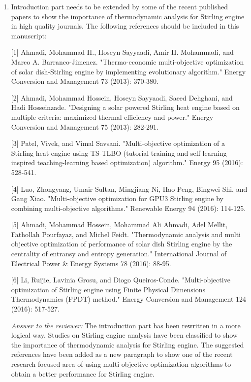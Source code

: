 \documentclass[12pt]{letter}
\begin{document}
\begin{enumerate}
\item Introduction part needs to be extended by some of the recent published papers to show the importance of thermodynamic analysis for Stirling engine in high quality journals. The following references should be included in this manuscript:

[1] Ahmadi, Mohammad H., Hoseyn Sayyaadi, Amir H. Mohammadi, and Marco A. Barranco-Jimenez. "Thermo-economic multi-objective optimization of solar dish-Stirling engine by implementing evolutionary algorithm." Energy Conversion and Management 73 (2013): 370-380. 

[2] Ahmadi, Mohammad Hossein, Hoseyn Sayyaadi, Saeed Dehghani, and Hadi Hosseinzade. "Designing a solar powered Stirling heat engine based on multiple criteria: maximized thermal efficiency and power." Energy Conversion and Management 75 (2013): 282-291.

[3] Patel, Vivek, and Vimal Savsani. "Multi-objective optimization of a Stirling heat engine using TS-TLBO (tutorial training and self learning inspired teaching-learning based optimization) algorithm." Energy 95 (2016): 528-541.

[4] Luo, Zhongyang, Umair Sultan, Mingjiang Ni, Hao Peng, Bingwei Shi, and Gang Xiao. "Multi-objective optimization for GPU3 Stirling engine by combining multi-objective algorithms." Renewable Energy 94 (2016): 114-125.

[5] Ahmadi, Mohammad Hossein, Mohammad Ali Ahmadi, Adel Mellit, Fathollah Pourfayaz, and Michel Feidt. "Thermodynamic analysis and multi objective optimization of performance of solar dish Stirling engine by the centrality of entransy and entropy generation." International Journal of Electrical Power \& Energy Systems 78 (2016): 88-95.

[6] Li, Ruijie, Lavinia Grosu, and Diogo Queiros-Conde. "Multi-objective optimization of Stirling engine using Finite Physical Dimensions Thermodynamics (FPDT) method." Energy Conversion and Management 124 (2016): 517-527.

\begin{snugshade*}
\emph{Answer to the reviewer:} The introduction part has been rewritten in a more logical way. Studies on Stirling engine analysis have been classified to show the importance of thermodynamic analysis for Stirling engine. The suggested references have been added as a new paragraph to show one of the recent research focused area of using multi-objective optimization algorithms to obtain a better performance for Stirling engine.
\end{snugshade*}


\end{enumerate}
\end{document}
